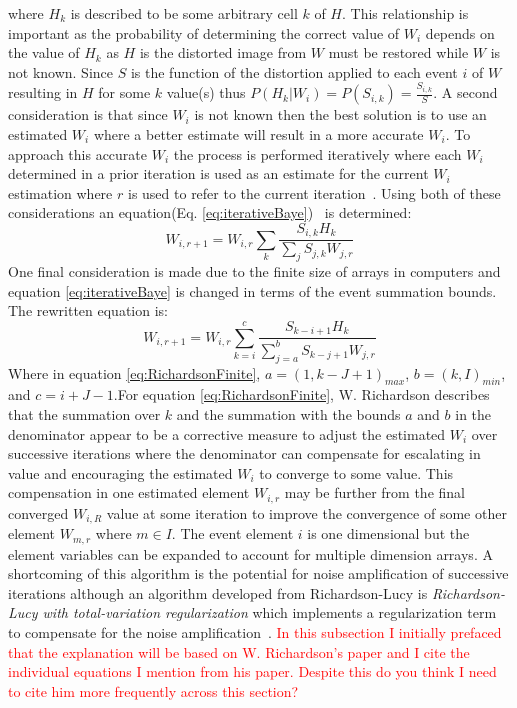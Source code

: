 where $H_k$ is described to be some arbitrary cell $k$ of $H$. This relationship is important as the probability of determining the correct value of $W_i$ depends on the value of $H_k$ as $H$ is the distorted image from $W$ must be restored while $W$ is not known. Since $S$ is the function of the distortion applied to each event $i$ of $W$ resulting in $H$ for some $k$ value(s) thus $P(H_k|W_i)=P(S_{i,k})=\frac{S_{i,k}}{S}$. A second consideration is that since $W_i$ is not known then the best solution is to use an estimated $W_i$ where a better estimate will result in a more accurate $W_i$. To approach this accurate $W_i$ the process is performed iteratively where each $W_i$ determined in a prior iteration is used as an estimate for the current $W_i$ estimation where $r$ is used to refer to the current iteration~\cite[Eq. 4]{Richardson}. Using both of these considerations an equation(Eq. \ref{eq:iterativeBaye})~\cite[Eq. 5]{Richardson} is determined:
\begin{equation}\label{eq:iterativeBaye}
    W_{i,r+1} = W_{i,r}\sum_k \frac{S_{i,k}H_k}{\sum_j S_{j,k}W_{j,r}}
\end{equation}
One final consideration is made due to the finite size of arrays in computers and equation \ref{eq:iterativeBaye} is changed in terms of the event summation bounds. The rewritten equation\cite[Eq. 6]{Richardson} is:
\begin{equation}\label{eq:RichardsonFinite}
    W_{i,r+1} = W_{i,r}\sum_{k=i}^c \frac{S_{k-i+1}H_k}{\sum_{j=a}^b S_{k-j+1}W_{j,r}}
\end{equation}
Where in equation \ref{eq:RichardsonFinite}, $a=(1, k-J+1)_{max}$, $b=(k,I)_{min}$, and $c=i+J-1$.For equation \ref{eq:RichardsonFinite}, W. Richardson describes that the summation over $k$ and the summation with the bounds $a$ and $b$ in the denominator appear to be a corrective measure to adjust the estimated $W_i$ over successive iterations where the denominator can compensate for escalating in value and encouraging the estimated $W_i$ to converge to some value. This compensation in one estimated element $W_{i,r}$ may be further from the final converged $W_{i,R}$ value at some iteration to improve the convergence of some other element $W_{m,r}$ where $m\in I$. The event element $i$ is one dimensional but the element variables can be expanded to account for multiple dimension arrays. A shortcoming of this algorithm is the potential for noise amplification of successive iterations although an algorithm developed from Richardson-Lucy is \textit{Richardson-Lucy with total-variation regularization} which implements a regularization term to compensate for the noise amplification~\cite[p.33]{DeconLab2}. 
\textcolor{red}{In this subsection I initially prefaced that the explanation will be based on W. Richardson's paper and I cite the individual equations I mention from his paper. Despite this do you think I need to cite him more frequently across this section?}


